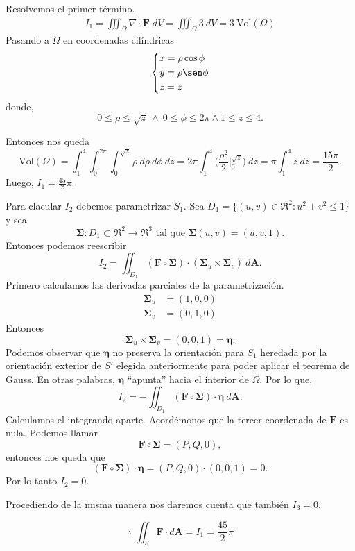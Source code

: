 \begin{solution}
    Resolvemos el primer t\'ermino.
    \begin{align*}
        I_1=\iiint _\Omega \nabla \cdot \mathbf{F}\;dV = \iiint _\Omega3\:dV = 3\:\text{Vol}(\Omega)
    \end{align*}
    Pasando a  $\Omega$ en coordenadas cil\'indricas
    \[\begin{dcases}
            x=\rho \cos \phi \\
            y=\rho \sen \phi \\
            z=z
        \end{dcases}\] donde, $$0\leq\rho\leq \sqrt{z}\:\land\:0\leq\phi\leq 2\pi \land 1\leq z \leq 4.$$

    Entonces nos queda
    \[
        \text{Vol}(\Omega) =  \int_1^4  \int_0^{2\pi} \int_0^{\sqrt{z}}  \rho\:d\rho\:d\phi \:dz=2\pi  \int_1^4 \Big( \frac{\rho^2}{2}\Big|_0^{\sqrt{z}} \Big) \:dz =  \pi   \int_1^4   z  \:dz= \frac{15 \pi}{2}.
    \] Luego, $I_1 =  \frac{45}{2}\pi. $

    Para clacular $I_2$  debemos parametrizar $S_1$.  Sea  $D_1=\{(u,v)\in\Re^2:u^2+v^2\leq1\}$ y  sea  $$\boldsymbol{\Sigma}:D_1\subset\Re^2\to\Re^3  \mbox{ tal que }   \boldsymbol{\Sigma}(u,v)=(u,v,1).$$
    Entonces podemos reescribir
    \[
        I_2=\iint _{D_1} (\mathbf{F}\circ\boldsymbol{\Sigma})\cdot
        (\boldsymbol{\Sigma}_u\times\boldsymbol{\Sigma}_v)\:d\mathbf{A}.
    \]
    Primero calculamos las derivadas parciales de la parametrizaci\'on.
    \begin{align*}
        \boldsymbol{\Sigma}_u & =(1,0,0) \\
        \boldsymbol{\Sigma}_v & =(0,1,0)
    \end{align*}
    Entonces
    \[
        \boldsymbol{\Sigma}_u\times\boldsymbol{\Sigma}_v=(0,0,1)=\boldsymbol{\eta}.
    \]
    Podemos observar que $\boldsymbol{\eta}$ no preserva la orientaci\'on  para $S_1$ heredada  por la orientaci\'on exterior de $S'$ elegida anteriormente para poder aplicar el teorema de Gauss. En otras palabras,  $\boldsymbol{\eta}$ ``apunta''  hacia el interior de $\Omega$.  Por lo que,
    \[
        I_2=-\iint _{D_1} (\mathbf{F}\circ\boldsymbol{\Sigma})\cdot \boldsymbol{\eta}\:d\mathbf{A}.
    \]
    Calculamos el integrando aparte. Acord\'emonos que la tercer coordenada de $\mathbf{F}$ es nula. Podemos llamar
    \[
        \mathbf{F}\circ\boldsymbol{\Sigma}=(P,Q,0),
    \]
    entonces nos queda que
    \[
        (\mathbf{F}\circ\boldsymbol{\Sigma})\cdot \boldsymbol{\eta}=(P,Q,0)\cdot (0,0,1)=0.
    \]
    Por lo tanto $I_2=0$.

    Procediendo de la misma manera nos daremos cuenta que tambi\'en $I_3=0$.

    $$\therefore\;\iint _{S} \mathbf{F}\cdot d\mathbf{A}=I_1=\frac{45}{2}\pi$$
\end{solution}

